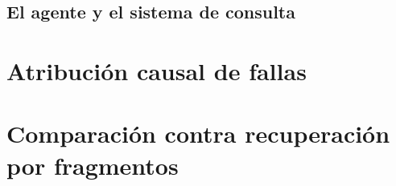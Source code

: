 \documentclass[12pt,a4paper]{report}
\begin{document}
\section{El agente y el sistema de consulta}
\label{sec:sistema}
%

\chapter{Atribución causal de fallas}
\label{cap:atribucion}

\chapter{Comparación contra recuperación por fragmentos}
\label{cap:comparacion}
\end{document}
